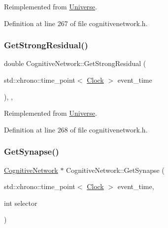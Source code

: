 Reimplemented from \hyperlink{class_universe_ab44daccba01ee7e3cf9b50bba83dd19e}{Universe}.



Definition at line 267 of file cognitivenetwork.\+h.

\mbox{\label{class_cognitive_network_acfa5de663b3e686c4d9ea1a3bb483b11}} 
\subsubsection{\texorpdfstring{Get\+Strong\+Residual()}{GetStrongResidual()}}
{\footnotesize\ttfamily double Cognitive\+Network\+::\+Get\+Strong\+Residual (\begin{DoxyParamCaption}\item[{std\+::chrono\+::time\+\_\+point$<$ \hyperlink{universe_8h_a0ef8d951d1ca5ab3cfaf7ab4c7a6fd80}{Clock} $>$}]{event\+\_\+time }\end{DoxyParamCaption})\hspace{0.3cm}{\ttfamily [inline]}, {\ttfamily [final]}, {\ttfamily [virtual]}}



Reimplemented from \hyperlink{class_universe_af0f4b81950061e63c2855eb40957a5b1}{Universe}.



Definition at line 268 of file cognitivenetwork.\+h.

\mbox{\label{class_cognitive_network_a1944aaa13667bc267e6ef44892da969d}} 
\subsubsection{\texorpdfstring{Get\+Synapse()}{GetSynapse()}}
{\footnotesize\ttfamily \hyperlink{class_cognitive_network}{Cognitive\+Network} $\ast$ Cognitive\+Network\+::\+Get\+Synapse (\begin{DoxyParamCaption}\item[{std\+::chrono\+::time\+\_\+point$<$ \hyperlink{universe_8h_a0ef8d951d1ca5ab3cfaf7ab4c7a6fd80}{Clock} $>$}]{event\+\_\+time,  }\item[{int}]{selector }\end{DoxyParamCaption})}



